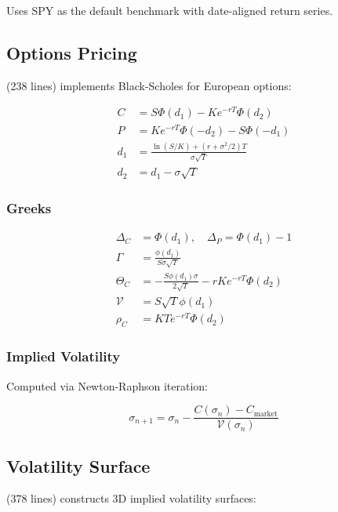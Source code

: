 Uses SPY as the default benchmark with date-aligned return series.

\subsection{Options Pricing}

 (238 lines) implements Black-Scholes for European options:

\begin{align}
C &= S \Phi(d_1) - K e^{-rT} \Phi(d_2) \label{eq:bs-call} \\
P &= K e^{-rT} \Phi(-d_2) - S \Phi(-d_1) \label{eq:bs-put} \\
d_1 &= \frac{\ln(S/K) + (r + \sigma^2/2)T}{\sigma\sqrt{T}} \\
d_2 &= d_1 - \sigma\sqrt{T}
\end{align}

\subsubsection{Greeks}

\begin{align}
\Delta_C &= \Phi(d_1), \quad \Delta_P = \Phi(d_1) - 1 \\
\Gamma &= \frac{\phi(d_1)}{S\sigma\sqrt{T}} \\
\Theta_C &= -\frac{S\phi(d_1)\sigma}{2\sqrt{T}} - rKe^{-rT}\Phi(d_2) \\
\mathcal{V} &= S\sqrt{T}\phi(d_1) \\
\rho_C &= KTe^{-rT}\Phi(d_2)
\end{align}

\subsubsection{Implied Volatility}

Computed via Newton-Raphson iteration:

\begin{equation}
\sigma_{n+1} = \sigma_n - \frac{C(\sigma_n) - C_{\text{market}}}{\mathcal{V}(\sigma_n)}
\end{equation}

\subsection{Volatility Surface}

 (378 lines) constructs 3D implied volatility surfaces:

